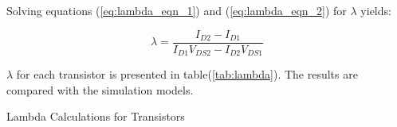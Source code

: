 Solving equations (\ref{eq:lambda_eqn_1}) and (\ref{eq:lambda_eqn_2}) for $\lambda$ yields:

\begin{equation}
	\label{eq:lambda_solved}
	\lambda = \frac{ I_{D2} - I_{D1} }{ I_{D1} V_{DS2} - I_{D2} V_{DS1} }
\end{equation}

$\lambda$ for each transistor is presented in table(\ref{tab:lambda}).
The results are compared with the simulation models.

\FloatBarrier

\begin{table}[h!]
	\centering
	\caption{Lambda Calculations for Transistors}
	\label{tab:lambda}
\end{table}

\FloatBarrier
